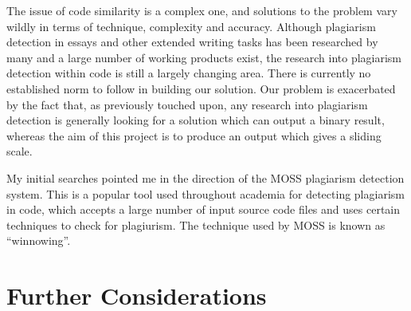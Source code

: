 The issue of code similarity is a complex one, and solutions to the problem
vary wildly in terms of technique, complexity and accuracy. Although plagiarism
detection in essays and other extended writing tasks has been 
researched by many and a large number of working products exist, the research
into plagiarism detection within code is still a largely changing area. There
is currently no established norm to follow in building our solution. Our problem
is exacerbated by the fact that, as previously touched upon,
any research into plagiarism detection is
generally looking for a solution which can output a binary result, whereas the
aim of this project is to produce an output which gives a sliding scale.

My initial searches pointed me in the direction of the MOSS plagiarism detection
system. This is a popular tool used throughout academia for detecting plagiarism
in code, which accepts a large number of input source code files and uses certain
techniques to check for plagiurism. The technique used by MOSS is known as 
``winnowing''\cite{winnowing}.


\section{Further Considerations}
